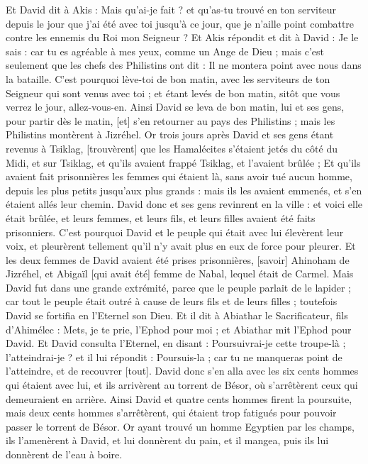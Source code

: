 \begin{multicols}{2}
Et David dit à Akis : Mais qu'ai-je fait ? et qu'as-tu trouvé en ton serviteur depuis le jour que j'ai été avec toi jusqu'à ce jour, que je n'aille point combattre contre les ennemis du Roi mon Seigneur ?
Et Akis répondit et dit à David : Je le sais : car tu es agréable à mes yeux, comme un Ange de Dieu ; mais c'est seulement que les chefs des Philistins ont dit : Il ne montera point avec nous dans la bataille.
C'est pourquoi lève-toi de bon matin, avec les serviteurs de ton Seigneur qui sont venus avec toi ; et étant levés de bon matin, sitôt que vous verrez le jour, allez-vous-en.
Ainsi David se leva de bon matin, lui et ses gens, pour partir dès le matin, [et] s'en retourner au pays des Philistins ; mais les Philistins montèrent à Jizréhel.
\VerseOne{}Or trois jours après David et ses gens étant revenus à Tsiklag, [trouvèrent] que les Hamalécites s'étaient jetés du côté du Midi, et sur Tsiklag, et qu'ils avaient frappé Tsiklag, et l'avaient brûlée ;
Et qu'ils avaient fait prisonnières les femmes qui étaient là, sans avoir tué aucun homme, depuis les plus petits jusqu'aux plus grands : mais ils les avaient emmenés, et s'en étaient allés leur chemin.
David donc et ses gens revinrent en la ville : et voici elle était brûlée, et leurs femmes, et leurs fils, et leurs filles avaient été faits prisonniers.
C'est pourquoi David et le peuple qui était avec lui élevèrent leur voix, et pleurèrent tellement qu'il n'y avait plus en eux de force pour pleurer.
Et les deux femmes de David avaient été prises prisonnières, [savoir] Ahinoham de Jizréhel, et Abigaïl [qui avait été] femme de Nabal, lequel était de Carmel.
Mais David fut dans une grande extrémité, parce que le peuple parlait de le lapider ; car tout le peuple était outré à cause de leurs fils et de leurs filles ; toutefois David se fortifia en l'Eternel son Dieu.
Et il dit à Abiathar le Sacrificateur, fils d'Ahimélec : Mets, je te prie, l'Ephod pour moi ; et Abiathar mit l'Ephod pour David.
Et David consulta l'Eternel, en disant : Poursuivrai-je cette troupe-là ; l'atteindrai-je ? et il lui répondit : Poursuis-la ; car tu ne manqueras point de l'atteindre, et de recouvrer [tout].
David donc s'en alla avec les six cents hommes qui étaient avec lui, et ils arrivèrent au torrent de Bésor, où s'arrêtèrent ceux qui demeuraient en arrière.
Ainsi David et quatre cents hommes firent la poursuite, mais deux cents hommes s'arrêtèrent, qui étaient trop fatigués pour pouvoir passer le torrent de Bésor.
Or ayant trouvé un homme Egyptien par les champs, ils l'amenèrent à David, et lui donnèrent du pain, et il mangea, puis ils lui donnèrent de l'eau à boire.

\end{multicols}
